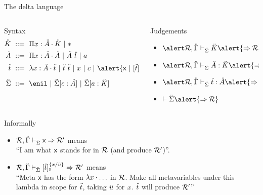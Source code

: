 \documentclass[ignorenonframetext,red]{beamer}
\begin{document}
\begin{frame}{The delta language}
  \inXLF
  \begin{columns}
    \begin{column}{0.6\textwidth}
      \begin{block}{Syntax} \vspace{-2em}
        \begin{align*}
          \mk &\gequal { \prd\mv\mf\mk \gor \type } \\
          \mf &\gequal { \prd\mv\mf\mf \gor \app\mf\mo \gor \mcf } \\
          \mo &\gequal { \lam\mv\mf\mo \gor \app\mo\mo \gor \mv \gor \mco
            \gor \alert{\mmeta \gor \ibox\mo\mmeta\mv\mo}
          } \\[0.5em]
          \msi &\gequal { \enil \gor \ebinddecl\msi\mco\mf \gor
            \ebinddecl\msi\mcf\mk }
        \end{align*}
      \end{block}
    \end{column}
    \begin{column}{0.4\textwidth}
      \begin{block}{Judgements}
        \begin{itemize}
        \item $\jindex\msi{\pair{\alert\mr}\me}\mk\alert{\To\mr}$
        \item $\jindex\msi{\pair{\alert\mr}\me}{\typ\mf\mk}\alert{\To\mr}$
        \item $\jindex\msi{\pair{\alert\mr}\me}{\typ\mo\mf}\alert{\To\mr}$
        \item $\vdash\msi\alert{\To\mr}$
        \end{itemize}
      \end{block}
    \end{column}
  \end{columns}
  \begin{block}{Informally}
    \begin{itemize}
    \item ${{\mathcal{R}},{\ddot{\Gamma}}}\vdash_{\ddot{\Sigma}}{\textsf{x}}\Rightarrow\mathcal{R'}$ {\footnotesize
        means}\\ “I am what $\textsf{x}$ stands for in $\mathcal{R}$ (and produce $\mathcal{R'}$)”.
    \item ${{\mathcal{R}},{\ddot{\Gamma}}}\vdash_{\ddot{\Sigma}}{[\ddot{t}]_{\textsf{x}}^{{}\{{x}/{\ddot{u}}\}}}\Rightarrow\mathcal{R'}$ {\footnotesize
        means}\\ “Meta $\textsf{x}$ has the form $\lambda{x}\cdot\ldots$ in $\mathcal{R}$. Make all
      metavariables under this lambda in scope for $\ddot{t}$, taking
      $\ddot{u}$ for $x$. $\ddot{t}$ will produce $\mathcal{R'}$”
    \end{itemize}
  \end{block}
\end{frame}
\end{document}
